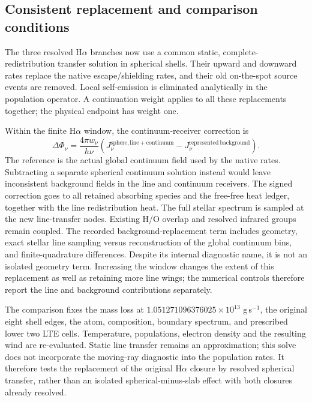 \subsection{Consistent replacement and comparison conditions}
The three resolved H$\alpha$ branches now use a common static,
complete-redistribution transfer solution in spherical shells. Their upward
and downward rates replace the native escape/shielding rates, and their
old on-the-spot source events are removed. Local self-emission is eliminated
analytically in the population operator. A continuation weight applies to
all these replacements together; the physical endpoint has weight one.

Within the finite H$\alpha$ window, the continuum-receiver correction is
\begin{equation}
 \Delta\Phi_\nu=\frac{4\pi w_\nu}{h\nu}
 \left(J_\nu^{\mathrm{sphere,line+continuum}}
       -J_\nu^{\mathrm{represented\ background}}\right).
\end{equation}
The reference is the actual global continuum field used by the native
rates. Subtracting a separate spherical continuum solution instead would
leave inconsistent background fields in the line and continuum receivers.
The signed correction goes to all retained absorbing species and the
free-free heat ledger, together with the line redistribution heat.
The full stellar spectrum is sampled at the new line-transfer nodes.
Existing H/O overlap and resolved infrared groups remain coupled.
The recorded background-replacement term includes geometry, exact stellar
line sampling versus reconstruction of the global continuum bins, and
finite-quadrature differences. Despite its internal diagnostic name, it is
not an isolated geometry term. Increasing the window changes the extent of
this replacement as well as retaining more line wings; the numerical
controls therefore report the line and background contributions separately.

The comparison fixes the mass loss at
$1.051271096376025\times10^{13}$ g\,s$^{-1}$, the original eight shell edges,
the atom, composition, boundary spectrum, and prescribed lower two LTE
cells. Temperature, populations, electron density and the resulting wind
are re-evaluated. Static line transfer remains an approximation; this solve
does not incorporate the moving-ray diagnostic into the population rates.
It therefore tests the replacement of the original H$\alpha$ closure by
resolved spherical transfer, rather than an isolated spherical-minus-slab
effect with both closures already resolved.

